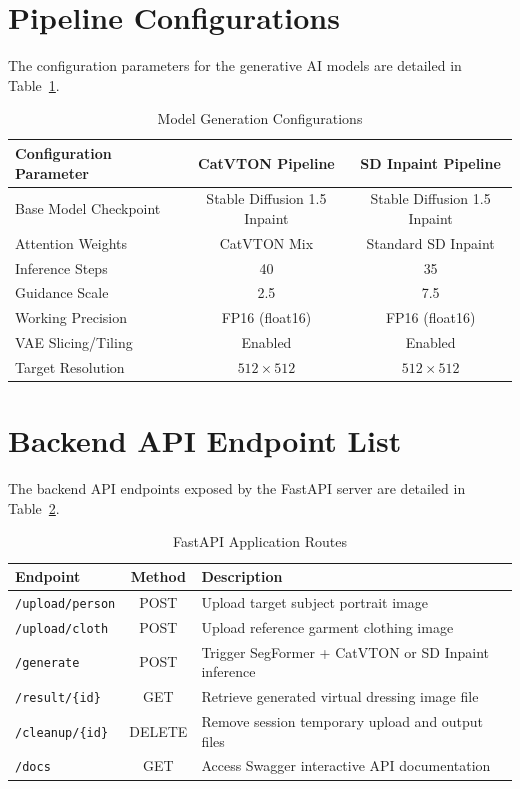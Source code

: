 \documentclass[12pt, a4paper]{report}
\begin{document}
\section{Pipeline Configurations}

The configuration parameters for the generative AI models are detailed in Table~\ref{tab:config}.

\begin{table}[h]
\centering
\caption{Model Generation Configurations}
\label{tab:config}
\begin{tabular}{|l|c|c|}
\hline
\textbf{Configuration Parameter} & \textbf{CatVTON Pipeline} & \textbf{SD Inpaint Pipeline} \\ \hline
Base Model Checkpoint & Stable Diffusion 1.5 Inpaint & Stable Diffusion 1.5 Inpaint \\
Attention Weights & CatVTON Mix & Standard SD Inpaint \\
Inference Steps & 40 & 35 \\
Guidance Scale & 2.5 & 7.5 \\
Working Precision & FP16 (float16) & FP16 (float16) \\
VAE Slicing/Tiling & Enabled & Enabled \\
Target Resolution & $512 \times 512$ & $512 \times 512$ \\
\hline
\end{tabular}
\end{table}

\section{Backend API Endpoint List}

The backend API endpoints exposed by the FastAPI server are detailed in Table~\ref{tab:api_endpoints}.

\begin{table}[h]
\centering
\begin{tabular}{|l|c|l|}
\hline
\textbf{Endpoint} & \textbf{Method} & \textbf{Description} \\ \hline
\texttt{/upload/person} & POST & Upload target subject portrait image \\
\texttt{/upload/cloth} & POST & Upload reference garment clothing image \\
\texttt{/generate} & POST & Trigger SegFormer + CatVTON or SD Inpaint inference \\
\texttt{/result/\{id\}} & GET & Retrieve generated virtual dressing image file \\
\texttt{/cleanup/\{id\}} & DELETE & Remove session temporary upload and output files \\
\texttt{/docs} & GET & Access Swagger interactive API documentation \\
\hline
\end{tabular}
\caption{FastAPI Application Routes}
\label{tab:api_endpoints}
\end{table}
\end{document}
